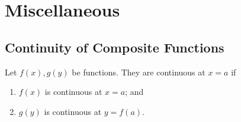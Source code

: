 \section{Miscellaneous}

\subsection{Continuity of Composite Functions}

Let $f(x), g(y)$ be functions. They are continuous at $x = a$ if

\begin{enumerate}
  \item $f(x)$ is continuous at $x = a$; and
  \item $g(y)$ is continuous at $y = f(a)$. 
\end{enumerate}